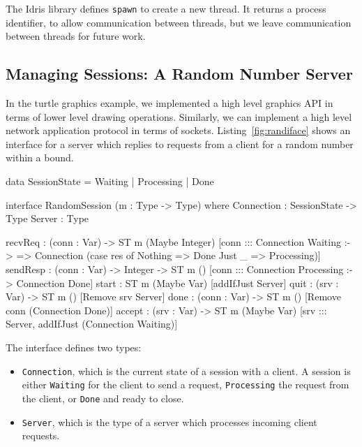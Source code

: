 The Idris library defines \texttt{spawn} to create a new thread. It
returns a process identifier, to allow communication between threads, but
we leave communication between threads for future work.

\subsection{Managing Sessions: A Random Number Server}

In the turtle graphics example, we implemented a high level
graphics API in terms of lower level drawing operations. Similarly, we can
implement a high level network application protocol in terms of sockets.
Listing~\ref{fig:randiface} shows an interface for a server which replies
to requests from a client for a random number within a bound. 

\small
\begin{code}[float=h, frame=single,caption={An interface for a server which
returns random numbers within a given bound},
label=fig:randiface]
data SessionState = Waiting | Processing | Done

interface RandomSession (m : Type -> Type) where
  Connection : SessionState -> Type
  Server : Type

  recvReq : (conn : Var) ->
    ST m (Maybe Integer) [conn ::: Connection Waiting :->
                           \res => Connection (case res of
                                                    Nothing => Done
                                                    Just _ => Processing)]
  sendResp : (conn : Var) -> Integer ->
             ST m () [conn ::: Connection Processing :-> Connection Done]
  start : ST m (Maybe Var) [addIfJust Server]
  quit : (srv : Var) -> ST m () [Remove srv Server]
  done : (conn : Var) -> ST m () [Remove conn (Connection Done)]
  accept : (srv : Var) ->
           ST m (Maybe Var) [srv ::: Server, addIfJust (Connection Waiting)]
\end{code}
\normalsize

The interface defines two types:

\begin{itemize}
\item \texttt{Connection}, which is the current state of a session with
a client. A session is either \texttt{Waiting} for the client to send
a request, \texttt{Processing} the request from the client, or \texttt{Done}
and ready to close.
\item \texttt{Server}, which is the type of a server which processes
incoming client requests.
\end{itemize}

